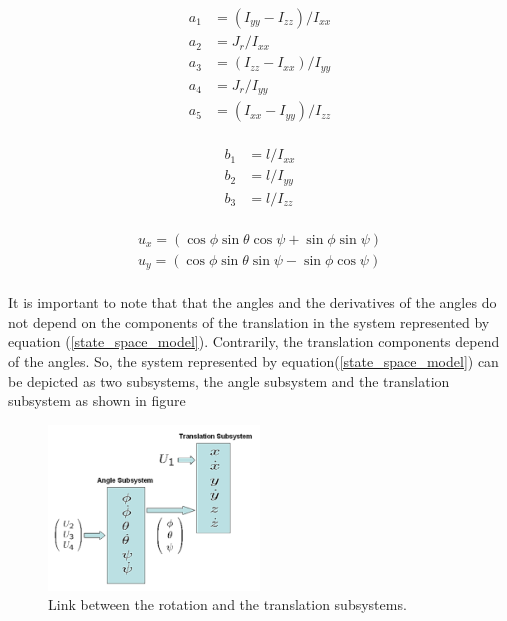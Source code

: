 \documentclass{thesisreport}
\begin{document}
\begin{multicols}{2}
 
\begin{equation*}
\begin{aligned}
a_1 &= (I_{yy} - I_{zz})/I_{xx}\\
a_2 &= J_r/I_{xx}\\
a_3 &= (I_{zz} - I_{xx})/I_{yy}\\
a_4 &= J_r/I_{yy}\\
a_5 &= (I_{xx} - I_{yy})/I_{zz}\\
\end{aligned}
\end{equation*}

\columnbreak

\begin{equation}
\begin{aligned}
b_1 &= l/I_{xx}\\
b_2 &=l/I_{yy}\\
b_3 &= l/I_{zz}\\
\end{aligned}
\end{equation}

\end{multicols}

\begin{equation}
	\begin{aligned}
	u_x = (\cos \phi \sin \theta \cos \psi + \sin \phi \sin \psi)\\
	u_y = (\cos \phi \sin \theta \sin \psi - \sin \phi \cos \psi)\\
	\end{aligned}
\end{equation}

It is important to note that that the angles and the derivatives of the angles do not depend on the components of the translation in the system represented by equation (\ref{state_space_model}). Contrarily, the translation components depend of the angles. So, the system represented by equation(\ref{state_space_model}) can be depicted as two subsystems, the angle subsystem and the translation subsystem as shown in figure 

\begin{figure}[h]
\centering 
\includegraphics[width=0.5\textwidth]{Images/Modeling/subsystems}
\caption{Link between the rotation and the translation subsystems.\cite{Bouabdalla2007}}
\end{figure}
\end{document}
